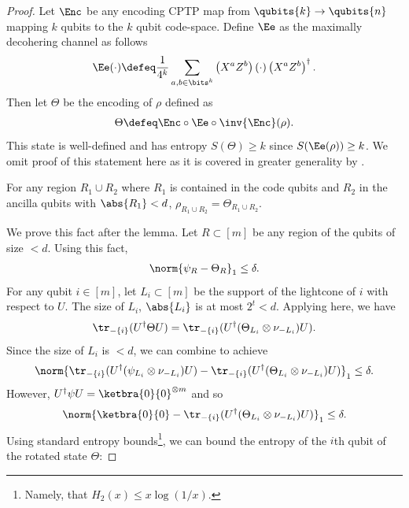 \documentclass{toc}
\begin{document}
\begin{proof}
Let $\Enc$ be any encoding CPTP map from $\qubits{k} \rightarrow \qubits{n}$ mapping $k$ qubits to the $k$ qubit code-space. Define $\Ee$ as the maximally decohering channel as follows
\begin{align}
\Ee(\cdot) \defeq \frac{1}{4^k} \sum_{a,b \in \bits^k} \left( X^a Z^b \right) (\cdot) \left( X^a Z^b \right)^\dagger.
\end{align}
Then let $\Theta$ be the encoding of $\rho$ defined as
\begin{align}
\label{eq:maxmixcode}
    \Theta \defeq \Enc \circ \Ee \circ \inv{\Enc} (\rho).
\end{align}
This state is well-defined and has entropy $S(\Theta) \geq k$ since $S(\Ee(\rho)) \geq k$. We omit proof of this statement here as it is covered in greater generality by .  
\begin{fact}
\label{fact:extension-of-LI}
For any region $R_1 \cup R_2$ where $R_1$ is contained in the code qubits and $R_2$ in the ancilla qubits with $\abs{R_1} < d$, $\rho_{R_1 \cup R_2} = \Theta_{R_1 \cup R_2}$.
\end{fact}
We prove this fact after the lemma. Let $R \subset [m]$ be any region of the qubits of size $< d$.
%
Using this fact,
\begin{align}
    \norm{\psi_R - \Theta_R}_1 \leq \delta.
    \label{eq:distance-trace}
\end{align}
For any qubit $i \in [m]$, let $L_i \subset [m]$ be the support of the lightcone of $i$ with respect to $U$. The size of $L_i$, $\abs{L_i}$ is at most $2^t < d$. Applying  here, we have
\begin{align}
    \label{eq:fact-trace}
    \tr_{-\{i\}}(U^\dagger \Theta U) = \tr_{-\{i\}}(U^\dagger (\Theta_{L_i}\otimes \nu_{-L_i}) U).
\end{align}
Since the size of $L_i$ is $< d$, we can combine   to achieve
\begin{align}
    \norm{\tr_{-\{i\}}(U^\dagger (\psi_{L_i}\otimes \nu_{-L_i}) U) - \tr_{-\{i\}}(U^\dagger (\Theta_{L_i}\otimes \nu_{-L_i}) U)}_1 \leq \delta.
\end{align}
However, $U^\dagger \psi U = \ketbra{0}{0}^{\otimes m}$ and so
\begin{align}
    \norm{\ketbra{0}{0} - \tr_{-\{i\}}(U^\dagger (\Theta_{L_i}\otimes \nu_{-L_i}) U)}_1 \leq \delta.
\end{align}
Using standard entropy bounds\footnote{Namely, that $H_2(x) \leq x \log(1/x)$.}, we can bound the entropy of the $i$th qubit of the rotated state $\Theta$:

\end{proof}
\end{document}

